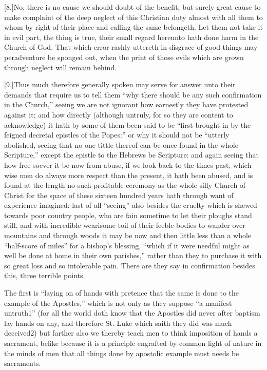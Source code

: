 [8.]No, there is no cause we should doubt of the benefit, but surely great cause to make complaint of the deep neglect of this Christian duty almost with all them to whom by right of their place and calling the same belongeth. Let them not take it in evil part, the thing is true, their small regard hereunto hath done harm in the Church of God. That which error rashly uttereth in disgrace of good things  may peradventure be sponged out,
 when the print of those evils which are grown through neglect will remain behind.

[9.]Thus much therefore generally spoken may serve for answer unto their demands that require us to tell them “why there should be any such confirmation in the Church,” seeing we are not ignorant how earnestly they have protested against it; and how directly (although untruly, for so they are content to acknowledge) it hath by some of them been said to be “first brought in by the feigned decretal epistles of the Popes:” or why it should not be “utterly abolished, seeing that no one tittle thereof can be once found in the whole Scripture,” except the epistle to the Hebrews be Scripture: and again seeing that how free soever it be now from abuse, if we look back to the times past, which wise men do always more respect than the present, it hath been abused, and is found at the length no such profitable ceremony as the whole silly Church of Christ for the space of these sixteen hundred years hath through want of experience imagined: last of all “seeing” also besides the cruelty which is shewed towards poor country people, who are fain sometime to let their ploughs stand still, and with incredible wearisome toil of their feeble bodies to wander over mountains and through woods it may be now and then little less than a whole “half-score of miles” for a  bishop’s blessing, “which if it were needful might as well be done at home in their own parishes,” rather than they to purchase it with so great loss and so intolerable pain. There are they say in confirmation besides this, three terrible points.

The first is “laying on of hands with pretence that the same is done to the example of the Apostles,” which is not only as they suppose “a manifest untruth1” (for all the world doth know that the Apostles did never after baptism lay hands on any, and therefore St. Luke which saith they did was much deceived2) but farther also we thereby teach men to think imposition of hands a sacrament, belike because it is a principle engrafted by common light of nature in the minds of men that all things done by apostolic example must needs be sacraments.

